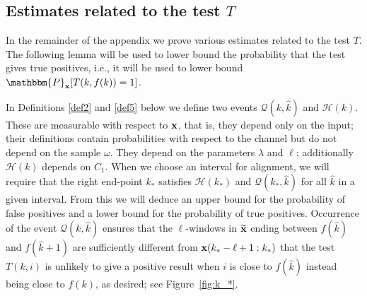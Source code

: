 \documentclass[final,12pt]{colt2018} %
\renewcommand{\P}{\mathbbm{P}}
\newcommand{\1}{\mathbf{1}}
\newcommand{\wt}{\widetilde}
\newcommand{\wh}{\widehat}
\def\xt{{\wt {\bf x}}}
\def\x{{\bf x}}
\def\Rhat{{\mathcal Q}}
\def\Rc{{\mathcal H}}
\begin{document}
\subsection{Estimates related to the test $T$} \label{ss:T}

In the remainder of the appendix we prove various estimates related to
the test $T$.  The following lemma will be used to lower bound the
probability that the test gives true positives, i.e., it will be used
to lower bound $\P_{\x}[ T(k,f(k)) = 1 ]$.

In Definitions \ref{def2} and \ref{def5} below we define two events
$\Rhat (k,\wh k)$ and $\Rc (k)$.  These are measurable with respect
to $\x$, that is, they depend only on the input; their definitions
contain probabilities with respect to the channel but do not depend
on the sample $\omega$.
They depend on the parameters $\lambda$ and $\ell$; additionally
$\Rc (k)$ depends on $C_1$.
%
When we choose an interval for alignment, we will require
that the right end-point $k_*$ satisfies $\Rc (k_*)$
and $\Rhat (k_*,\wh k)$ for all $\wh k$ in a given interval.
From this we will deduce an upper bound for the probability of
false positives and a lower bound for the probability of true positives.
Occurrence of the event $\Rhat (k,\wh k)$ ensures that the $\ell$-windows
in $\xt$ ending between $f(\wh k)$ and $f(\wh k+1)$ are sufficiently
different from $\x(k_* - \ell + 1 : k_*)$ that the test $T(k,i)$ is
unlikely to give a positive result when $i$ is close to $f(\wh k)$
instead being close to $f(k)$, as desired; see Figure~\ref{fig:k_*}.
\end{document}
